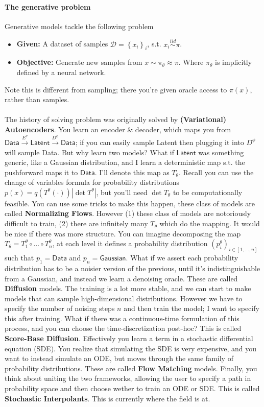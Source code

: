 \paragraph{The generative problem}
Generative models tackle the following problem
\begin{itemize}
	\item \textbf{Given:} A dataset of samples $\mathcal D = \left\{ x_i \right\}_i$, s.t. $x_i \overset{iid}{\sim} \pi$. 
	\item \textbf{Objective:} Generate new samples from $x \sim \pi_\theta \approx \pi$. Where $\pi_\theta$ is implicitly defined by a neural network.
\end{itemize}
Note this is different from sampling; there you're given oracle access to $\pi(x)$, rather than samples.\\
\\
The history of solving problem was originally solved by \textbf{(Variational) Autoencoders}. You learn an encoder \& decoder, which maps you from $\textsf{Data} \overset{E^\theta}{\to} \textsf{Latent} \overset{D^\phi}{\to} \textsf{Data}$; if you can easily sample \textsf{Latent} then plugging it into $D^\phi$ will sample \textsf{Data}. But why learn two models? What if $\textsf{Latent}$ was something generic, like a Gaussian distribution, and I learn a deterministic map s.t. the pushforward maps it to $\textsf{Data}$. I'll denote this map as $T_\theta$. Recall you can use the change of variables formula for probability distributions $p(x) = q(T^\theta(\cdot)) |\det T^\theta|$, but you'll need $\det T_\theta$ to be computationally feasible. You can use some tricks to make this happen, these class of models are called \textbf{Normalizing Flows}. However (1) these class of models are notoriously difficult to train, (2) there are infinitely many $T_\theta$ which do the mapping. It would be nice if there was more structure. You can imagine decomposing the map $T_\theta = T^\theta_1 \circ ... \circ T^\theta_n$, at each level it defines a probability distribution $(p_i^\theta)_{i \in [1, ..., n]}$ such that $p_1 = \textsf{Data}$ and $p_n = \textsf{Gaussian}$. What if we assert each probability distribution has to be a noisier version of the previous, until it's indistinguishable from a Gaussian, and instead we learn a denoising oracle. These are called \textbf{Diffusion} models. The training is a lot more stable, and we can start to make models that can sample high-dimensional distributions. However we have to specify the number of noising steps $n$ and then train the model; I want to specify this after training. What if there was a continuous-time formulation of this process, and you can choose the time-discretization post-hoc? This is called \textbf{Score-Base Diffusion}. Effectively you learn a term in a stochastic differential equation (SDE). You realize that simulating the SDE is very expensive, and you want to instead simulate an ODE, but moves through the same family of probability distributions. These are called \textbf{Flow Matching} models. Finally, you think about uniting the two frameworks, allowing the user to specify a path in probability space and then choose wether to train an ODE or SDE. This is called \textbf{Stochastic Interpolants}. This is currently where the field is at.

